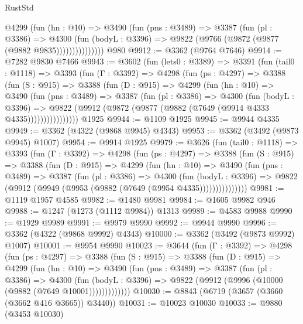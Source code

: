 \begin{lexlean}{RustStd}
\begin{coremodule}
                @4299
                  (fun (hn : @10) =>
                  @3490
                    (fun (pns : @3489) =>
                    @3387
                      (fun (pl : @3386) =>
                      @4300
                        (fun (bodyL : @3396) =>
                        @9822 (@9766 (@9872 (@9877 (@9882 @9835)))))))))))))))
    @980
@9912 := @3362 (@9764 @7646)
@9914 := @7282 @9830 @7466
@9943 := @3602
    (fun (lets0 : @3389) =>
    @3391
      (fun (tail0 : @1118) =>
      @3393
        (fun (Γ : @3392) =>
        @4298
          (fun (ps : @4297) =>
          @3388
            (fun (S : @915) =>
            @3388
              (fun (D : @915) =>
              @4299
                (fun (hn : @10) =>
                @3490
                  (fun (pns : @3489) =>
                  @3387
                    (fun (pl : @3386) =>
                    @4300
                      (fun (bodyL : @3396) =>
                      @9822 (@9912 (@9872 (@9877 (@9882 (@7649 (@9914 @4333 @4335))))))))))))))))
    @1925
@9944 := @1109 @1925
@9945 := @9944 @4335
@9949 := @3362 (@4322 (@9868 @9945) @4343)
@9953 := @3362 (@3492 (@9873 @9945) @1007)
@9954 := @9914 @1925
@9979 := @3626
    (fun (tail0 : @1118) =>
    @3393
      (fun (Γ : @3392) =>
      @4298
        (fun (ps : @4297) =>
        @3388
          (fun (S : @915) =>
          @3388
            (fun (D : @915) =>
            @4299
              (fun (hn : @10) =>
              @3490
                (fun (pns : @3489) =>
                @3387
                  (fun (pl : @3386) =>
                  @4300
                    (fun (bodyL : @3396) =>
                    @9822 (@9912 (@9949 (@9953 (@9882 (@7649 (@9954 @4335)))))))))))))))
@9981 := @1119 @1957 @4585
@9982 := @1480 @9981
@9984 := @1605 @9982 @946
@9988 := @1247 (@1273 (@1112 @9984)) @1313
@9989 := @4583 @9988
@9990 := @1929 @9989
@9991 := @9979 @9990
@9992 := @9944 @9990
@9996 := @3362 (@4322 (@9868 @9992) @4343)
@10000 := @3362 (@3492 (@9873 @9992) @1007)
@10001 := @9954 @9990
@10023 := @3644
    (fun (Γ : @3392) =>
    @4298
      (fun (ps : @4297) =>
      @3388
        (fun (S : @915) =>
        @3388
          (fun (D : @915) =>
          @4299
            (fun (hn : @10) =>
            @3490
              (fun (pns : @3489) =>
              @3387
                (fun (pl : @3386) =>
                @4300
                  (fun (bodyL : @3396) =>
                  @9822 (@9912 (@9996 (@10000 (@9882 (@7649 @10001)))))))))))))
@10030 := @8843 (@6719 (@3657 (@3660 (@3662 @416 @3665)) @3440))
@10031 := @10023 @10030
@10033 := @9880 (@3453 @10030)

\end{coremodule}
\end{lexlean}
